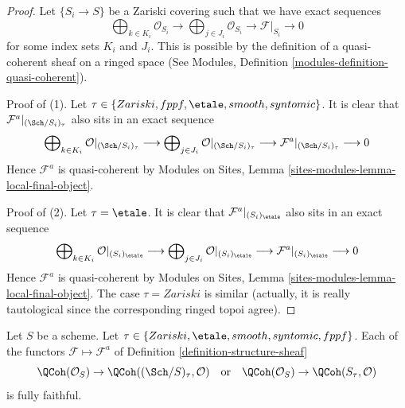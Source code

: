\begin{proof}
Let $\{S_i \to S\}$ be a Zariski covering such that we have exact sequences
$$
\bigoplus\nolimits_{k \in K_i} \mathcal{O}_{S_i} \longrightarrow
\bigoplus\nolimits_{j \in J_i} \mathcal{O}_{S_i} \longrightarrow
\mathcal{F}|_{S_i} \longrightarrow 0
$$
for some index sets $K_i$ and $J_i$. This is possible by the definition
of a quasi-coherent sheaf on a ringed space
(See Modules, Definition \ref{modules-definition-quasi-coherent}).

\medskip\noindent
Proof of (1). Let $\tau \in \{Zariski, \linebreak[0] fppf, \linebreak[0]
\etale, \linebreak[0] smooth, \linebreak[0] syntomic\}$.
It is clear that $\mathcal{F}^a|_{(\Sch/S_i)_\tau}$ also
sits in an exact sequence
$$
\bigoplus\nolimits_{k \in K_i} \mathcal{O}|_{(\Sch/S_i)_\tau}
\longrightarrow
\bigoplus\nolimits_{j \in J_i} \mathcal{O}|_{(\Sch/S_i)_\tau}
\longrightarrow
\mathcal{F}^a|_{(\Sch/S_i)_\tau} \longrightarrow 0
$$
Hence $\mathcal{F}^a$ is quasi-coherent by Modules on Sites,
Lemma \ref{sites-modules-lemma-local-final-object}.

\medskip\noindent
Proof of (2). Let $\tau = \etale$.
It is clear that $\mathcal{F}^a|_{(S_i)_\etale}$ also sits
in an exact sequence
$$
\bigoplus\nolimits_{k \in K_i} \mathcal{O}|_{(S_i)_\etale}
\longrightarrow
\bigoplus\nolimits_{j \in J_i} \mathcal{O}|_{(S_i)_\etale}
\longrightarrow
\mathcal{F}^a|_{(S_i)_\etale} \longrightarrow 0
$$
Hence $\mathcal{F}^a$ is quasi-coherent by Modules on Sites,
Lemma \ref{sites-modules-lemma-local-final-object}.
The case $\tau = Zariski$ is similar (actually, it is really
tautological since the corresponding ringed topoi agree).
\end{proof}

\begin{lemma}
\label{lemma-fully-faithful-associated}
Let $S$ be a scheme.
Let $\tau \in \{Zariski, \linebreak[0] \etale, \linebreak[0]
smooth, \linebreak[0] syntomic, \linebreak[0] fppf\}$.
Each of the functors $\mathcal{F} \mapsto \mathcal{F}^a$
of Definition \ref{definition-structure-sheaf}
$$
\QCoh(\mathcal{O}_S) \to \QCoh((\Sch/S)_\tau, \mathcal{O})
\quad\text{or}\quad
\QCoh(\mathcal{O}_S) \to \QCoh(S_\tau, \mathcal{O})
$$
is fully faithful.
\end{lemma}


